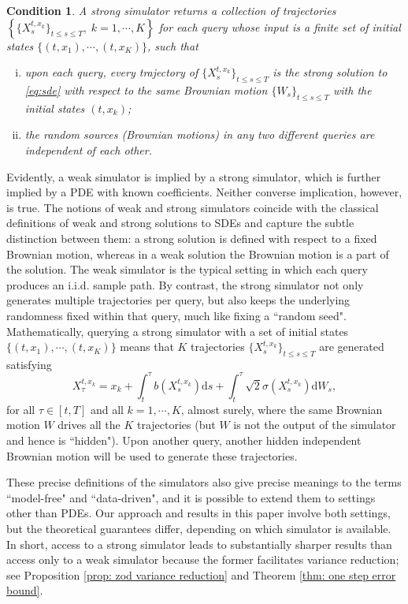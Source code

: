 \documentclass[twoside,11pt]{article}
\newcommand{\dd}{\mathrm{d}}
\newtheorem{cond}{Condition}
\newcommand{\1}{\mathbf{1}}
\numberwithin{equation}{section}
\begin{document}
\begin{cond}
\label{cond:strong simulator}
A strong simulator returns a collection of trajectories $\left\{\{X_s^{t,x_k}\}_{t\leq s\leq T},\;k=1,\cdots,K\right\}$ for each query whose input is a finite set of initial states $\{(t,x_1),\cdots,(t,x_K)\}$, such that
\begin{enumerate}[(i)]
\item upon each query, every trajectory of $\{X_s^{t,x_k}\}_{t\leq s\leq T}$ is the strong solution to \eqref{eq:sde} with respect to the same Brownian motion $\{W_s\}_{t\leq s\leq T}$ with the initial states $(t,x_k)$;
\item the random sources (Brownian motions) in any two different queries are independent of each other.
\end{enumerate}
\end{cond}

Evidently, a weak simulator is implied by a strong simulator, which is further implied by a PDE with known coefficients. Neither converse implication, however, is true.
The notions of weak and strong simulators coincide with the classical definitions of weak and strong solutions to SDEs and capture the subtle distinction between them: a strong solution is defined with respect to a fixed Brownian motion, whereas in a weak solution the Brownian motion is a part of the solution. The weak simulator is the typical setting in which each query produces an i.i.d. sample path. By contrast, the strong simulator not only generates multiple trajectories per query, but also keeps the underlying randomness fixed within that query, much like fixing a ``random seed". Mathematically, querying a strong simulator with a set of initial states $\{(t,x_1),\cdots,(t,x_K)\}$ means that $K$ trajectories $\{ X^{t,x_k}_s \}_{t\leq s\leq T}$ are generated satisfying
\[ X_{\tau}^{t,x_k} = x_k + \int_t^{\tau} b(X_s^{t,x_k})\dd s + \int_t^{\tau} \sqrt{2}\sigma(X_s^{t,x_k})\dd W_s,\] for all $\tau\in [t,T]$ and all $k=1,\cdots,K$, almost surely, where the same Brownian motion $W$ drives all the $K$ trajectories (but $W$ is not the output of the simulator and hence is ``hidden"). Upon another query, another hidden independent Brownian motion will be used to generate these trajectories.

These precise definitions of the simulators also give precise meanings to the terms ``model-free" and ``data-driven", and it is possible to extend them to settings other than PDEs.
Our approach and results in this paper involve both settings, but the theoretical guarantees differ, depending on which simulator is available. In short, access to a strong simulator leads to substantially sharper results than access only to a weak simulator because the former facilitates variance reduction; see Proposition \ref{prop: zod variance reduction} and Theorem \ref{thm: one step error bound}.
\end{document}
